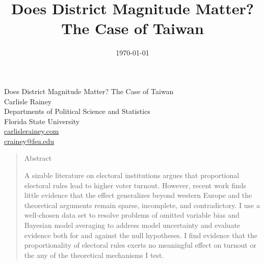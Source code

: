 \documentclass[12pt]{article}
\title{Does District Magnitude Matter? The Case of Taiwan}
\date{\today}
\begin{document}
\begin{center}
{\LARGE Does District Magnitude Matter? The Case of Taiwan}\\\vspace{2mm}
\vspace{3mm}
Carlisle Rainey\\
Departments of Political Science and Statistics\\
Florida State University\\
\href{http://www.carlislerainey.com}{carlislerainey.com}\\
\href{mailto:crainey@fsu.edu}{crainey@fsu.edu}\\\vspace{3mm}

\end{center}


\begin{quote}
\begin{center} Abstract\end{center}
A sizable literature on electoral institutions argues that proportional electoral rules lead to higher voter turnout. However, recent work finds little evidence that the effect generalizes beyond western Europe and the theoretical arguments remain sparse, incomplete, and contradictory. I use a well-chosen data set to resolve problems of omitted variable bias and Bayesian model averaging to address model uncertainty and evaluate evidence both for and against the null hypotheses. I find evidence that the proportionality of electoral rules exerts no meaningful effect on turnout or the any of the theoretical mechanisms I test.
\end{quote}
\end{document}

